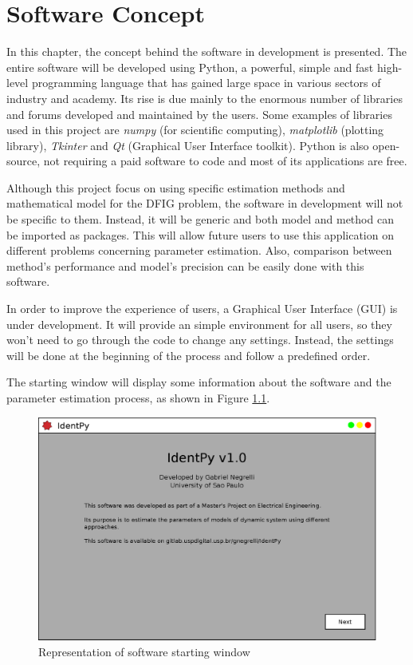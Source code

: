\chapter{Software Concept}

\label{ch: software}

In this chapter, the concept behind the software in development is presented. The entire software will be developed using Python, a powerful, simple and fast high-level programming language that has gained large space in various sectors of industry and academy. Its rise is due mainly to the enormous number of libraries and forums developed and maintained by the users. Some examples of libraries used in this project are \textit{numpy} (for scientific computing), \textit{matplotlib} (plotting library), \textit{Tkinter} and \textit{Qt} (Graphical User Interface toolkit). Python is also open-source, not requiring a paid software to code and most of its applications are free.

Although this project focus on using specific estimation methods and mathematical model for the DFIG problem, the software in development will not be specific to them. Instead, it will be generic and both model and method can be imported as packages. This will allow future users to use this application on different problems concerning parameter estimation. Also, comparison between method's performance and model's precision can be easily done with this software.

In order to improve the experience of users, a Graphical User Interface (GUI) is under development. It will provide an simple environment for all users, so they won't need to go through the code to change any settings. Instead, the settings will be done at the beginning of the process and follow a predefined order.

The starting window will display some information about the software and the parameter estimation process, as shown in Figure \ref{fig: init_pg}.

\begin{figure}[h]
	\caption{Representation of software starting window}
	\begin{center}
		\includegraphics[scale=.5]{Images/Software_init_pg.eps}
	\end{center}
	\label{fig: init_pg}
\end{figure}


